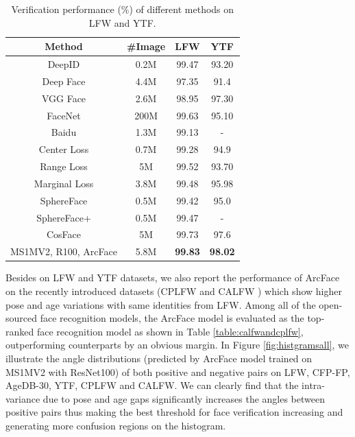 \documentclass[10pt,twocolumn,letterpaper]{article}
\begin{document}
\begin{table}[t!]
\begin{center}
\begin{tabular}{c|c|c|c}
\hline
Method &  \#Image &  LFW       & YTF\\
\hline
DeepID \cite{sun2014deep}            & 0.2M    &99.47 &93.20\\
Deep Face \cite{taigman2014deepface} & 4.4M    &97.35 &91.4\\
VGG Face \cite{parkhi2015deep}       &2.6M     &98.95 &97.30\\
FaceNet \cite{schroff2015facenet}    & 200M    &99.63 &95.10\\
Baidu \cite{liu2015targeting}     &1.3M       &99.13 & -\\
Center Loss \cite{wen2016discriminative} & 0.7M &99.28 &94.9\\
Range Loss \cite{zhang2016range}     &5M    &99.52 &93.70\\
Marginal Loss \cite{deng2017marginal} & 3.8M   &99.48 &95.98 \\
SphereFace \cite{liu2017sphereface}  & 0.5M     &99.42 &95.0\\
SphereFace+ \cite{liu2018learning}   & 0.5M    &99.47 & - \\
CosFace \cite{tencent2017CosineFace} & 5M    &99.73 &97.6\\
MS1MV2, R100, ArcFace               & 5.8M   &{\bf 99.83} & {\bf 98.02} \\
\hline
\end{tabular}
\end{center}
\vspace{-2mm}
\caption{Verification performance ($\%$) of different methods on LFW and YTF.}
\label{table:lfwytf}
\vspace{-4mm}
\end{table}

Besides on LFW and YTF datasets, we also report the performance of ArcFace on the recently introduced datasets (\eg CPLFW \cite{zheng2018cross} and CALFW \cite{zheng2017cross}) which show higher pose and age variations with same identities from LFW. Among all of the open-sourced face recognition models, the ArcFace model is evaluated as the top-ranked face recognition model as shown in Table \ref{table:calfwandcplfw}, outperforming counterparts by an obvious margin. In Figure \ref{fig:histgramsall}, we illustrate the angle distributions (predicted by ArcFace model trained on MS1MV2 with ResNet100) of both positive and negative pairs on LFW, CFP-FP, AgeDB-30, YTF, CPLFW and CALFW. We can clearly find that the intra-variance due to pose and age gaps significantly increases the angles between positive pairs thus making the best threshold for face verification increasing and generating more confusion regions on the histogram. 
\end{document}
